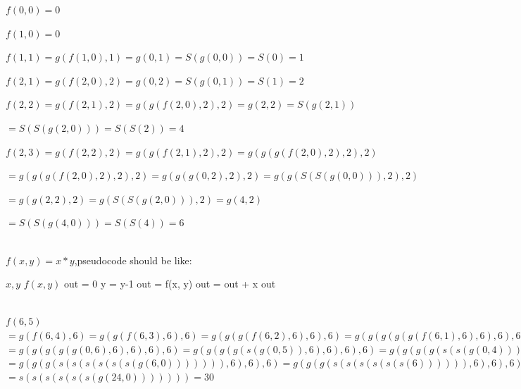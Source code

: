 \documentclass{article}
\begin{document}
$f(0,0) = 0$

$f(1,0) = 0$

$f(1,1) 
    = g(f(1,0),1)
    = g(0,1)
    = S(g(0,0))
    = S(0)
    = 1$

$f(2,1)
    = g(f(2,0),2)
    = g(0,2)
    = S(g(0,1)) 
    = S(1)
    = 2$
   
$f(2,2) 
    = g(f(2,1),2)
    = g(g(f(2,0),2),2)
    = g(2,2)
    = S(g(2,1))$
    
    $= S(S(g(2,0)))
    = S(S(2))
    = 4$

$f(2,3)
    = g(f(2,2),2)
    = g(g(f(2,1),2),2)
    = g(g(g(f(2,0),2),2),2)$
    
    $= g(g(g(f(2,0),2),2),2)
    = g(g(g(0,2),2),2)
    = g(g(S(S(g(0,0))),2),2)$
    
    $= g(g(2,2),2)
    = g(S(S(g(2,0))),2)
    = g(4,2)$
    
    $= S(S(g(4,0)))
    = S(S(4))
    = 6$
\\\\
$f(x,y) = x*y$,pseudocode should be like:
\begin{algorithm}
    \caption{function }
    \begin{algorithmic}[1]
    \Require $x,y$
    \Ensure $f(x,y)$
    \State out = 0
    \State y = y-1
    \State out = f(x, y)
    \State out = out + x
    \EndFor 
    \EndWhile 
    \State \Return out
    \EndFunction
    \end{algorithmic}

\end{algorithm}

\\
$f(6,5)$
\\
$=g(f(6,4),6)
=g(g(f(6,3),6),6)
=g(g(g(f(6,2),6),6),6)
=g(g(g(g(g(f(6,1),6),6),6),6),6)
=g(g(g(g(g(f(6,0),6),6),6),6),6)$
\\
$=g(g(g(g(g(0,6),6),6),6),6)
=g(g(g(g(s(g(0,5)),6),6),6),6)
=g(g(g(g(s(s(g(0,4))),6),6),6),6)
=g(g(g(g(s(s(s(g(0,3)))),6),6),6),6)
=g(g(g(g(s(s(s(s(g(0,2))))),6),6),6),6)
=g(g(g(g(s(s(s(s(s(g(0,1)))))),6),6),6),6)
=g(g(g(g(s(s(s(s(s(s(g(0,0)))))),6),6),6),6)
=g(g(g(g(s(s(s(s(s(s(0))))),6),6),6),6)
=g(g(g(g(6,6),6),6),6)$
\\
$=g(g(g(s(s(s(s(s(s(g(6,0))))))),6),6),6)
=g(g(g(s(s(s(s(s(s(6)))))),6),6),6)
=g(g(g(12,6),6),6)
=g(g(18,6),6)
=g(24,6)$
\\
$=s(s(s(s(s(s(g(24,0)))))))
=30$
\end{document}
